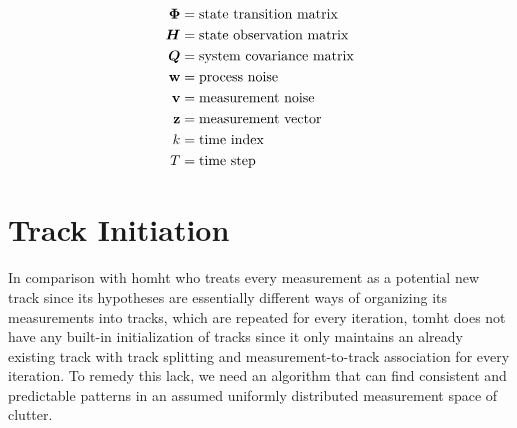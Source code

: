 \begin{equation*}
\begin{split}
\bm{\Phi} 	&= \text{state transition matrix} \\
\bm{H}		&= \text{state observation matrix} \\
\bm{Q}		&= \text{system covariance matrix} \\
\boldsymbol{\mathbf{w}}		&= \text{process noise} \\
\boldsymbol{\mathbf{v}}		&= \text{measurement noise} \\
\boldsymbol{\mathbf{z}}		&= \text{measurement vector} \\
k 			&= \text{time index} \\
T  			&= \text{time step} \\
\end{split}
\end{equation*}

\section{Track Initiation}
In comparison with \gls{homht} who treats every measurement as a potential new track since its hypotheses are essentially different ways of organizing its measurements into tracks, which are repeated for every iteration, \gls{tomht} does not have any built-in initialization of tracks since it only maintains an already existing track with track splitting and measurement-to-track association for every iteration. To remedy this lack, we need an algorithm that can find consistent and predictable patterns in an assumed uniformly distributed measurement space of clutter. 

